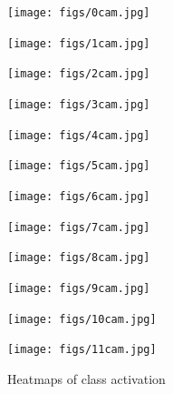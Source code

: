 \begin{figure}[H]

  \begin{minipage}[t]{.3\linewidth}
    \centering
    \texttt{[image: figs/0cam.jpg]}
    
  \end{minipage}
  \hfill
\begin{minipage}[t]{.3\linewidth}
    \centering
    \texttt{[image: figs/1cam.jpg]}
    
  \end{minipage}
  \hfill
  \begin{minipage}[t]{.3\linewidth}
    \centering
    \texttt{[image: figs/2cam.jpg]}
    
  \end{minipage}
  \hfill
  \begin{minipage}[t]{.3\linewidth}
    \centering
    \texttt{[image: figs/3cam.jpg]}
    
  \end{minipage}
  \hfill
  \begin{minipage}[t]{.3\linewidth}
    \centering
    \texttt{[image: figs/4cam.jpg]}
    
  \end{minipage}
  \hfill
\begin{minipage}[t]{.3\linewidth}
    \centering
    \texttt{[image: figs/5cam.jpg]}
   
  \end{minipage}
  \hfill
\begin{minipage}[t]{.3\linewidth}
    \centering
    \texttt{[image: figs/6cam.jpg]}
    
  \end{minipage}
  \hfill
\begin{minipage}[t]{.3\linewidth}
    \centering
    \texttt{[image: figs/7cam.jpg]}
    
  \end{minipage}
  \hfill
  \begin{minipage}[t]{.3\linewidth}
    \centering
    \texttt{[image: figs/8cam.jpg]}
    
  \end{minipage}
  \hfill
\begin{minipage}[t]{.3\linewidth}
    \centering
    \texttt{[image: figs/9cam.jpg]}
    
  \end{minipage}
  \hfill
\begin{minipage}[t]{.3\linewidth}
    \centering
    \texttt{[image: figs/10cam.jpg]}
    
  \end{minipage}
  \hfill
  \begin{minipage}[t]{.3\linewidth}
    \centering
    \texttt{[image: figs/11cam.jpg]}
    
  \end{minipage}
  \hfill
  \caption{Heatmaps of class activation}
  \vspace{-3mm}
  
\end{figure}



